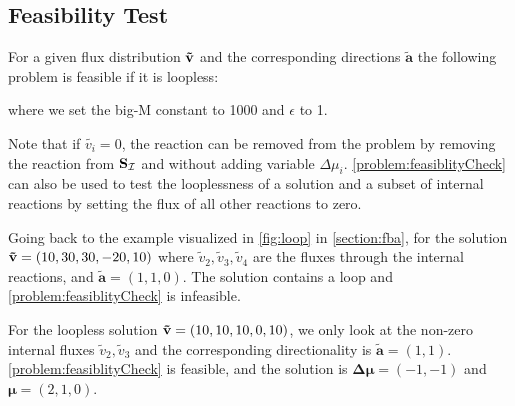
\subsection{Feasibility Test} \label{section:feasibility_test}
For a given flux distribution $\bold{\tilde{v}}$ and the corresponding directions $\boldsymbol{\tilde{a}}$ the following problem is feasible if it is loopless:
\quad where we set the big-M constant to 1000 and $\epsilon$ to 1. 

Note that if $\tilde{v_i} = 0$, the reaction can be removed from the problem by removing the reaction from $\bold S_{\mathcal{I}}$ and without adding variable $\Delta \mu_i$. 
\cref{problem:feasiblityCheck} can also be used to test the looplessness of a solution and a subset of internal reactions by setting the flux of all other reactions to zero.

Going back to the example visualized in \cref{fig:loop} in \cref{section:fba}, for the solution $\bold{\tilde v} = (10, 30, 30, -20, 10)$ where $\tilde v_2, \tilde v_3, \tilde v_4$ are the fluxes through the internal reactions, and $\boldsymbol{\tilde a} = (1,1,0)$. The solution contains a loop and \cref{problem:feasiblityCheck} is infeasible. 

For the loopless solution $\bold{\tilde v} = (10, 10, 10, 0, 10)$, we only look at the non-zero internal fluxes $\tilde v_2, \tilde v_3$ and the corresponding directionality is $\boldsymbol{\tilde a} = (1,1)$. \cref{problem:feasiblityCheck} is feasible, and the solution is $\boldsymbol{\Delta \mu}=(-1, -1)$ and $\boldsymbol \mu = (2,1,0)$. 

